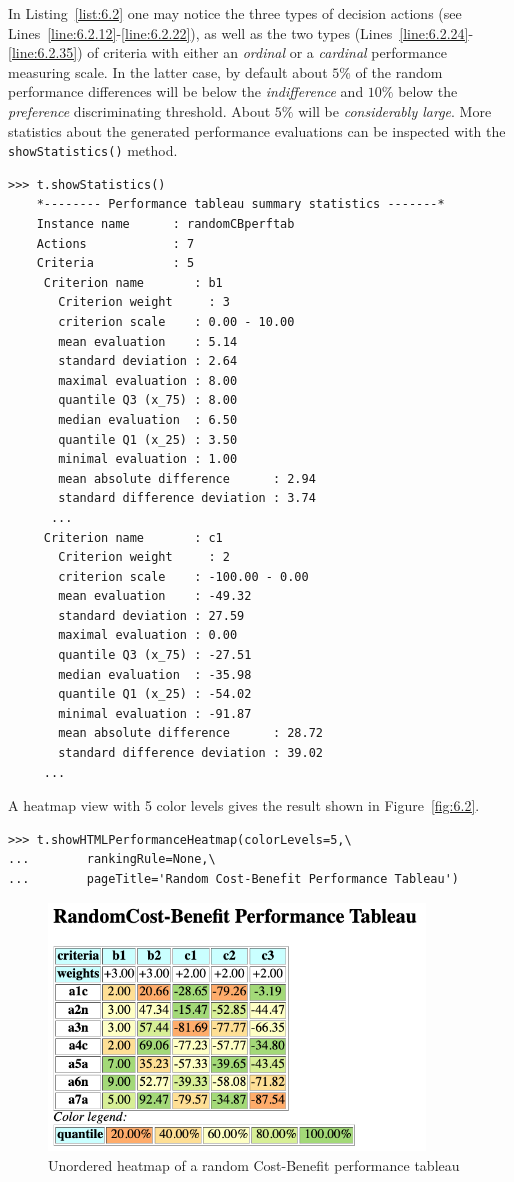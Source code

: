 In Listing~\vref{list:6.2} one may notice the three types of decision actions (see Lines~\ref{line:6.2.12}-\ref{line:6.2.22}), as well as the two types (Lines~\ref{line:6.2.24}-\ref{line:6.2.35}) of criteria with either an \emph{ordinal} or a \emph{cardinal} performance measuring scale. In the latter case, by default about $5\%$ of the random performance differences will be below the \emph{indifference} and $10\%$ below the \emph{preference} discriminating threshold. About $5\%$ will be \emph{considerably large}. More statistics about the generated performance evaluations can be inspected with the \texttt{showStatistics()} method.
\begin{lstlisting}
>>> t.showStatistics()
    *-------- Performance tableau summary statistics -------*
    Instance name      : randomCBperftab
    Actions            : 7
    Criteria           : 5
     Criterion name       : b1
       Criterion weight     : 3
       criterion scale    : 0.00 - 10.00
       mean evaluation    : 5.14
       standard deviation : 2.64
       maximal evaluation : 8.00
       quantile Q3 (x_75) : 8.00
       median evaluation  : 6.50
       quantile Q1 (x_25) : 3.50
       minimal evaluation : 1.00
       mean absolute difference      : 2.94
       standard difference deviation : 3.74
      ...
     Criterion name       : c1
       Criterion weight     : 2
       criterion scale    : -100.00 - 0.00
       mean evaluation    : -49.32
       standard deviation : 27.59
       maximal evaluation : 0.00
       quantile Q3 (x_75) : -27.51
       median evaluation  : -35.98
       quantile Q1 (x_25) : -54.02
       minimal evaluation : -91.87
       mean absolute difference      : 28.72
       standard difference deviation : 39.02
     ...
\end{lstlisting}

A heatmap view with 5 color levels gives the result shown in Figure~\vref{fig:6.2}.
\begin{lstlisting}
>>> t.showHTMLPerformanceHeatmap(colorLevels=5,\
...        rankingRule=None,\
...        pageTitle='Random Cost-Benefit Performance Tableau')
 \end{lstlisting}
\begin{figure}[ht]
\includegraphics[width=10cm]{Figures/6-2-randomCBHeatmap.png}
\caption{Unordered heatmap of a random Cost-Benefit performance tableau}
\label{fig:6.2}       %
\end{figure}
 
